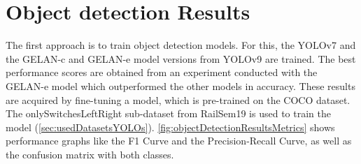 \section{Object detection Results}
\label{sec:objectDetectionResults}

The first approach is to train object detection models.
For this, the \ac{YOLO}v7 and the \ac{GELAN}-c and \ac{GELAN}-e model versions from \ac{YOLO}v9 are trained.
The best performance scores are obtained from an experiment conducted with the \ac{GELAN}-e model which outperformed the other models in accuracy.
These results are acquired by fine-tuning a model, which is pre-trained on the COCO dataset.
The onlySwitchesLeftRight sub-dataset from RailSem19 is used to train the model (\autoref{sec:usedDatasetsYOLOs}).
\autoref{fig:objectDetectionResultsMetrics} shows performance graphs like the F1 Curve and the Precision-Recall Curve, as well as the confusion matrix with both classes.

